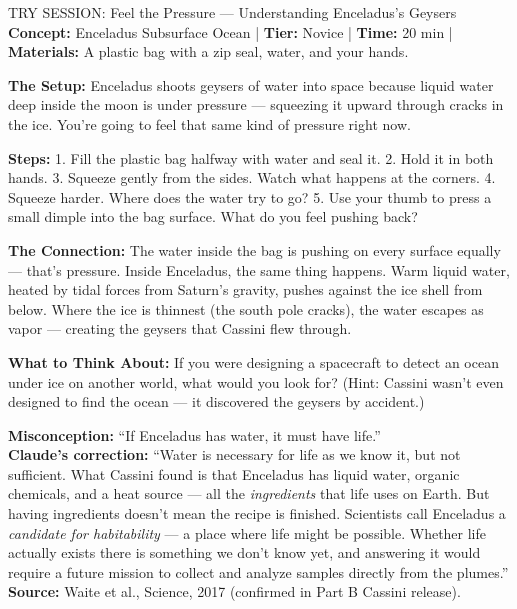 \documentclass[11pt,letterpaper]{article}
\begin{document}
\begin{trybox}{TRY SESSION: Feel the Pressure — Understanding Enceladus's Geysers}
\textbf{Concept:} Enceladus Subsurface Ocean | \textbf{Tier:} Novice | \textbf{Time:} 20 min | \textbf{Materials:} A plastic bag with a zip seal, water, and your hands.

\textbf{The Setup:} Enceladus shoots geysers of water into space because liquid water deep inside the moon is under pressure --- squeezing it upward through cracks in the ice. You're going to feel that same kind of pressure right now.

\textbf{Steps:} 1. Fill the plastic bag halfway with water and seal it. 2. Hold it in both hands. 3. Squeeze gently from the sides. Watch what happens at the corners. 4. Squeeze harder. Where does the water try to go? 5. Use your thumb to press a small dimple into the bag surface. What do you feel pushing back?

\textbf{The Connection:} The water inside the bag is pushing on every surface equally --- that's pressure. Inside Enceladus, the same thing happens. Warm liquid water, heated by tidal forces from Saturn's gravity, pushes against the ice shell from below. Where the ice is thinnest (the south pole cracks), the water escapes as vapor --- creating the geysers that Cassini flew through.

\textbf{What to Think About:} If you were designing a spacecraft to detect an ocean under ice on another world, what would you look for? (Hint: Cassini wasn't even designed to find the ocean --- it discovered the geysers by accident.)
\end{trybox}

\begin{claudebox}
\textbf{Misconception:} ``If Enceladus has water, it must have life.''\\[0.4em]
\textbf{Claude's correction:} ``Water is necessary for life as we know it, but not sufficient. What Cassini found is that Enceladus has liquid water, organic chemicals, and a heat source --- all the \textit{ingredients} that life uses on Earth. But having ingredients doesn't mean the recipe is finished. Scientists call Enceladus a \textit{candidate for habitability} --- a place where life might be possible. Whether life actually exists there is something we don't know yet, and answering it would require a future mission to collect and analyze samples directly from the plumes.''\\[0.4em]
\textbf{Source:} Waite et al., Science, 2017 (confirmed in Part B Cassini release).
\end{claudebox}
\end{document}
